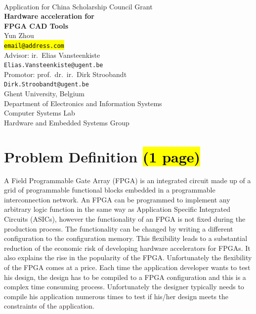 \documentclass[a4paper,oneside,12pt]{article}
\begin{document}

\thispagestyle{empty}

\begin{center}
\mbox{}\\\vspace{5mm}
{\Large Application for China Scholarship Council Grant}\\ [45mm]
%
{\bf\Huge Hardware acceleration for\\
[3mm] FPGA CAD Tools} \\
\vspace{45mm}
\Large Yun Zhou \\
\vspace{2mm}
\small\texttt{\hl{email@address.com}} \\
\vspace{20mm}
\Large Advisor: ir.\ Elias Vansteenkiste \\
\small\texttt{Elias.Vansteenkiste@ugent.be} \\
\vspace{2mm}
\Large Promotor: prof.\ dr.\ ir.\ Dirk Stroobandt \\
\small\texttt{Dirk.Stroobandt@ugent.be} \\
\vspace{20mm}
\normalsize Ghent University, Belgium \\
\normalsize Department of Electronics and Information Systems\\
\normalsize Computer Systems Lab\\
\normalsize Hardware and Embedded Systems Group 
\end{center}

\newpage

\tableofcontents

\clearpage

\section{Problem Definition \hl{(1 page)}}
A Field Programmable Gate Array (FPGA) is an integrated circuit made up of a grid of programmable functional blocks embedded in a programmable interconnection network. An FPGA can be programmed to implement any arbitrary logic function in the same way as Application Specific Integrated Circuits (ASICs), however the functionality of an FPGA is not fixed during the production process. The functionality can be changed by writing a different configuration to the configuration memory. This flexibility leads to a substantial reduction of the economic risk of developing hardware accelerators for FPGAs. It also explains the rise in the popularity of the FPGA. Unfortunately the flexibility of the FPGA comes at a price.  Each time the application developer wants to test his design, the design has to be compiled to a FPGA configuration and this is a complex time consuming process. Unfortunately the designer typically needs to compile his application numerous times to test if his/her design meets the constraints of the application. 
\end{document}
